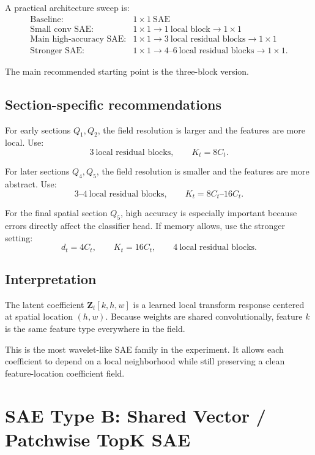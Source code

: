 \documentclass[11pt]{article}
\newcommand{\Ztens}{\mathbf{Z}}
\begin{document}
A practical architecture sweep is:
\[
\begin{array}{ll}
\text{Baseline:} & 1\times1\ \text{SAE} \\
\text{Small conv SAE:} & 1\times1 \rightarrow 1\ \text{local block} \rightarrow 1\times1 \\
\text{Main high-accuracy SAE:} & 1\times1 \rightarrow 3\ \text{local residual blocks} \rightarrow 1\times1 \\
\text{Stronger SAE:} & 1\times1 \rightarrow 4\text{--}6\ \text{local residual blocks} \rightarrow 1\times1.
\end{array}
\]

The main recommended starting point is the three-block version.

\subsection{Section-specific recommendations}

For early sections \(Q_1,Q_2\), the field resolution is larger and the features are more local. Use:
\[
3\ \text{local residual blocks},
\qquad
K_t = 8C_t.
\]

For later sections \(Q_4,Q_5\), the field resolution is smaller and the features are more abstract. Use:
\[
3\text{--}4\ \text{local residual blocks},
\qquad
K_t = 8C_t\text{--}16C_t.
\]

For the final spatial section \(Q_5\), high accuracy is especially important because errors directly affect the classifier head. If memory allows, use the stronger setting:
\[
d_t = 4C_t,
\qquad
K_t = 16C_t,
\qquad
4\ \text{local residual blocks}.
\]

\subsection{Interpretation}

The latent coefficient \(\Ztens_t[k,h,w]\) is a learned local transform response centered at spatial location \((h,w)\). Because weights are shared convolutionally, feature \(k\) is the same feature type everywhere in the field.

This is the most wavelet-like SAE family in the experiment. It allows each coefficient to depend on a local neighborhood while still preserving a clean feature-location coefficient field.


\section{SAE Type B: Shared Vector / Patchwise TopK SAE}
\end{document}

